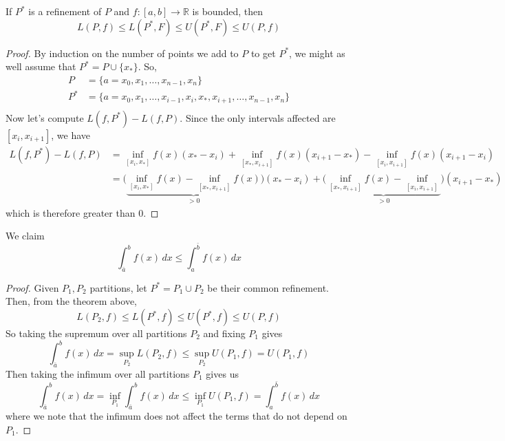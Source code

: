   \begin{lemma}
    If $P^\ast$ is a refinement of $P$ and $f: [a, b] \to \mathbb{R}$ is bounded, then 
    \begin{equation}
      L(P, f) \leq L(P^\ast, F) \leq U(P^\ast, F) \leq U(P, f) 
    \end{equation}
  \end{lemma}
  \begin{proof} 
    By induction on the number of points we add to $P$ to get $P^\ast$, we might as well assume that $P^\ast = P \cup \{x_\ast\}$. So, 
    \begin{align}
      P & = \{a = x_0, x_1, \ldots, x_{n-1}, x_n \} \\
      P^\ast & = \{a = x_0, x_1, \ldots, x_{i-1}, x_i, x_\ast, x_{i+1}, \ldots, x_{n-1}, x_n \} \\
    \end{align}
    Now let's compute $L(f, P^\ast) - L(f, P)$. Since the only intervals affected are $[x_i, x_{i+1}]$, we have 
    \begin{align}
      L(f, P^\ast) - L(f, P) & = \inf_{[x_i, x_{\ast}]} f(x) (x_{\ast} - x_i) + \inf_{[x_\ast, x_{i+1}]} f(x) (x_{i+1} - x_\ast) - \inf_{[x_{i}, x_{i+1}]} f(x) (x_{i+1} - x_i) \\ 
                             & = \big( \underbrace{\inf_{[x_i, x_{\ast}]} f(x) - \inf_{[x_{\ast}, x_{i+1}]} f(x)}_{> 0} \big) (x_\ast - x_i) + \big( \underbrace{\inf_{[x_\ast, x_{i+1}]} f(x) - \inf_{[x_i , x_{i+1}]}}_{> 0} \big) (x_{i+1} - x_\ast) 
    \end{align}
    which is therefore greater than $0$. 
  \end{proof}

  \begin{theorem}
    We claim
    \begin{equation}
      \int_{\bar{a}}^b f(x) \, dx \leq \int_{a}^{\bar{b}} f(x) \, dx
    \end{equation}
  \end{theorem}
  \begin{proof}
    Given $P_1, P_2$ partitions, let $P^\ast = P_1 \cup P_2$ be their common refinement. Then, from the theorem above, 
    \begin{equation}
      L(P_2, f) \leq L(P^\ast, f) \leq U(P^\ast, f) \leq U(P, f) 
    \end{equation}
    So taking the supremum over all partitions $P_2$ and fixing $P_1$ gives 
    \begin{equation}
      \int_{\bar{a}}^b f(x) \, dx = \sup_{P_2} L(P_2, f) \leq \sup_{P_2} U(P_1, f) = U(P_1, f)
    \end{equation}
    Then taking the infimum over all partitions $P_1$ gives us 
    \begin{equation}
      \int_{\bar{a}}^b f(x) \, dx = \inf_{P_1} \int_{\bar{a}}^b f(x) \, dx \leq \inf_{P_1} U(P_1, f) = \int_{a}^{\bar{b}} f(x) \,dx
    \end{equation}
    where we note that the infimum does not affect the terms that do not depend on $P_1$. 
  \end{proof}

